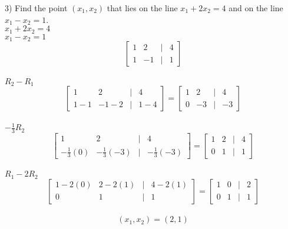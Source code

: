 \documentclass[]{article}
\begin{document}
3) Find the point $(x_1, x_2)$ that lies on the line $x_1+2x_2=4$ and on the line $x_1-x_2=1$.\\
$x_1 + 2x_2 = 4$\\
$x_1-x_2=1$\\
\[
\begin{bmatrix}
	1 & 2 & | & 4 \\
	1 & -1 & | & 1
\end{bmatrix}
\]\\
$R_2 - R_1$\\
\[
\begin{bmatrix}
	1 & 2 & | & 4 \\
	1-1 & -1-2 & | & 1 - 4
\end{bmatrix}=
\begin{bmatrix}
	1 & 2 & | & 4\\
	0 & -3 & | & -3
\end{bmatrix}
\]\\
$-\frac{1}{3}R_2$\\
\[
\begin{bmatrix}
	1 & 2 & | & 4\\
	-\frac{1}{3}(0) & -\frac{1}{3}(-3) & | & -\frac{1}{3}(-3)
\end{bmatrix}=
\begin{bmatrix}
	1 & 2 & | & 4 \\
	0 & 1 & | & 1
\end{bmatrix}
\]\\
$R_1 - 2R_2$\\
\[
\begin{bmatrix}
	1 - 2(0) & 2 - 2(1) & | & 4 - 2(1)\\
	0 & 1 & | & 1
\end{bmatrix}=
\begin{bmatrix}
	1 & 0 & | & 2\\
	0 & 1 & | & 1
\end{bmatrix}
\]\\
$$(x_1, x_2) = (2, 1)$$\\
\end{document}
